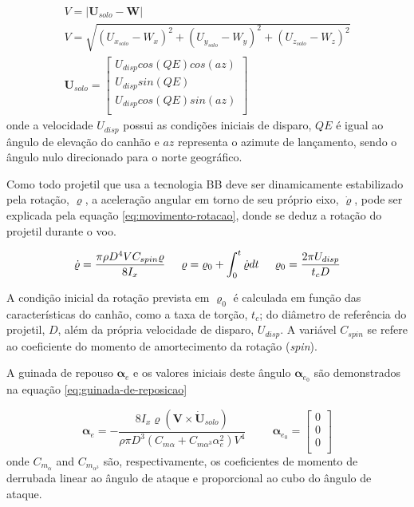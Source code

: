 \begin{gather}
    \label{eq:Vvel}
    V = |\boldsymbol{U}_{solo} - \boldsymbol{W}| \\ 
    \label{eq:Vmag}
    V = \sqrt{(U_{x_{solo}}-W_{x})^2 + (U_{y_{solo}}-W_{y})^2 + (U_{z_{solo}}-W_{z})^2} \\
    \label{eq:Uvec}
    \boldsymbol{U}_{solo} = \begin{bmatrix} 
        U_{disp}cos(QE)cos(az) \\
        U_{disp}sin(QE)\\
        U_{disp}cos(QE)sin(az) \\
    \end{bmatrix}
\end{gather}
%
onde a velocidade $U_{disp}$ possui as condições iniciais de disparo, $QE$ é igual ao ângulo de elevação do canhão e $az$ representa o azimute de lançamento, sendo o ângulo nulo direcionado para o norte geográfico.

Como todo projetil que usa a tecnologia BB deve ser dinamicamente estabilizado pela rotação, $\varrho$, a aceleração angular em torno de seu próprio eixo, $\dot{\varrho}$, pode ser explicada pela equação \ref{eq:movimento-rotacao}, donde se deduz a rotação do projetil durante o voo.

\begin{equation}
    \label{eq:movimento-rotacao}
    \dot{\varrho} = \frac{\pi\rho D^{4}VC_{spin}\varrho}{8I_{x}} 
    \hspace{0.5cm}
    \varrho = \varrho_{0} + \int_{0}^{t}\dot{\varrho}dt 
    \hspace{0.5cm}
    \varrho_{0} = \frac{2\pi U_{disp}}{t_{c}D} 
\end{equation}

A condição inicial da rotação prevista em $\varrho_{0}$ é calculada em função das características do canhão, como a taxa de torção, $t_c$; do diâmetro de referência do projetil, $D$, além da própria velocidade de disparo, $U_{disp}$. A variável $C_{spin}$ se refere ao coeficiente do momento de amortecimento da rotação (\textit{spin}).

A guinada de repouso $\boldsymbol{\alpha}_{e}$ e os valores iniciais deste ângulo $\boldsymbol{\alpha}_{e_{0}}$ são demonstrados na equação \ref{eq:guinada-de-reposicao}

\begin{equation}
	\label{eq:guinada-de-reposicao}
	 \boldsymbol{\alpha}_{e} = -\frac{8I_{x}\varrho(\boldsymbol{V}\times\dot{\boldsymbol{U}}_{solo})}{\rho\pi D^{3}(C_{m\alpha} + C_{m\alpha^{3}}\alpha_{e}^2)V^{4}}
	 \hspace{1cm}
	 \boldsymbol{\alpha}_{e_{0}} =
    \begin{bmatrix} 
        0 \\
        0 \\
        0 \\
    \end{bmatrix}
\end{equation}
%
onde $C_{m_{\alpha}}$ and $C_{m_{\alpha^3}}$ são, respectivamente, os coeficientes de momento de derrubada linear ao ângulo de ataque e proporcional ao cubo do ângulo de ataque.

